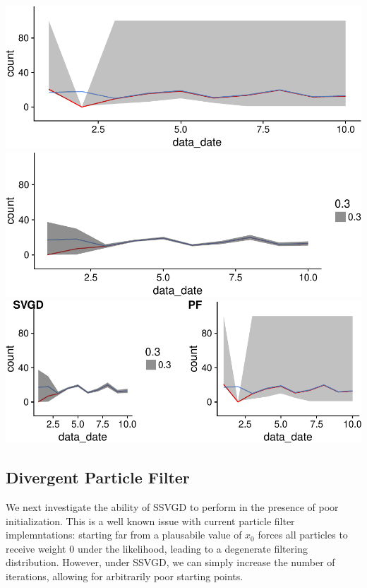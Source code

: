 \documentclass[]{article}
\begin{document}
\includegraphics{ssvgd_files/figure-latex/unnamed-chunk-3-1.pdf}
\includegraphics{ssvgd_files/figure-latex/unnamed-chunk-3-2.pdf}
\includegraphics{ssvgd_files/figure-latex/unnamed-chunk-3-3.pdf}

\subsection{Divergent Particle Filter}\label{divergent-particle-filter}

We next investigate the ability of SSVGD to perform in the presence of
poor initialization. This is a well known issue with current particle
filter implemntations: starting far from a plausabile value of \(x_0\)
forces all particles to receive weight \(0\) under the likelihood,
leading to a degenerate filtering distribution. However, under SSVGD, we
can simply increase the number of iterations, allowing for arbitrarily
poor starting points.
\end{document}
